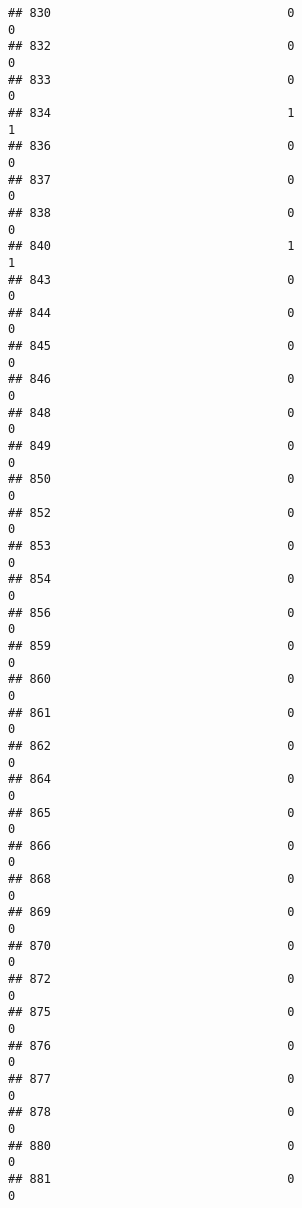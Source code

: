\documentclass[
]{article}
\begin{document}
\begin{verbatim}
## 830                                 0                                0
## 832                                 0                                0
## 833                                 0                                0
## 834                                 1                                1
## 836                                 0                                0
## 837                                 0                                0
## 838                                 0                                0
## 840                                 1                                1
## 843                                 0                                0
## 844                                 0                                0
## 845                                 0                                0
## 846                                 0                                0
## 848                                 0                                0
## 849                                 0                                0
## 850                                 0                                0
## 852                                 0                                0
## 853                                 0                                0
## 854                                 0                                0
## 856                                 0                                0
## 859                                 0                                0
## 860                                 0                                0
## 861                                 0                                0
## 862                                 0                                0
## 864                                 0                                0
## 865                                 0                                0
## 866                                 0                                0
## 868                                 0                                0
## 869                                 0                                0
## 870                                 0                                0
## 872                                 0                                0
## 875                                 0                                0
## 876                                 0                                0
## 877                                 0                                0
## 878                                 0                                0
## 880                                 0                                0
## 881                                 0                                0

\end{verbatim}
\end{document}
